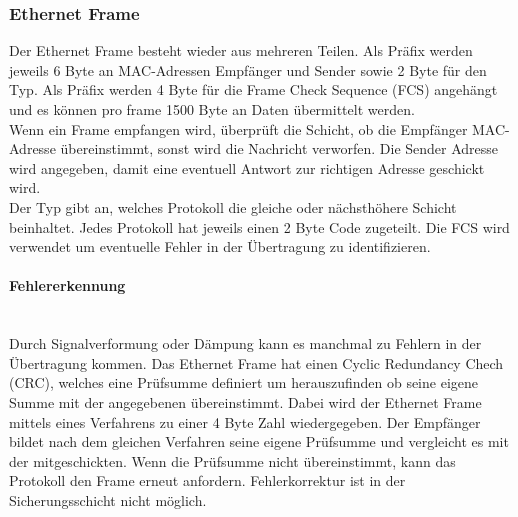 \documentclass{article}
\newcommand{\paragraphlb}[1]{\paragraph{#1}\mbox{}\\}
\begin{document}
	 \subsubsection{Ethernet Frame}
	 Der Ethernet Frame besteht wieder aus mehreren Teilen. Als Präfix werden jeweils 6 Byte an MAC-Adressen Empfänger und Sender sowie 2 Byte für den Typ. Als Präfix werden 4 Byte für die Frame Check Sequence (FCS) angehängt und es können pro frame 1500 Byte an Daten übermittelt werden. \\
	 Wenn ein Frame empfangen wird, überprüft die Schicht, ob die Empfänger MAC-Adresse übereinstimmt, sonst wird die Nachricht verworfen. Die Sender Adresse wird angegeben, damit eine eventuell Antwort zur richtigen Adresse geschickt wird.\\
	 Der Typ gibt an, welches Protokoll die gleiche oder nächsthöhere Schicht beinhaltet. Jedes Protokoll hat jeweils einen 2 Byte Code zugeteilt. Die FCS wird verwendet um eventuelle Fehler in der Übertragung zu identifizieren. \\
	 \paragraphlb{Fehlererkennung}
	 Durch Signalverformung oder Dämpung kann es manchmal zu Fehlern in der Übertragung kommen. Das Ethernet Frame hat einen Cyclic Redundancy Chech (CRC), welches eine Prüfsumme definiert um herauszufinden ob seine eigene Summe mit der angegebenen übereinstimmt. Dabei wird der Ethernet Frame mittels eines Verfahrens zu einer 4 Byte Zahl wiedergegeben. Der Empfänger bildet nach dem gleichen Verfahren seine eigene Prüfsumme und vergleicht es mit der mitgeschickten. Wenn die Prüfsumme nicht übereinstimmt, kann das Protokoll den Frame erneut anfordern. Fehlerkorrektur ist in der Sicherungsschicht nicht möglich.\\
\end{document}
